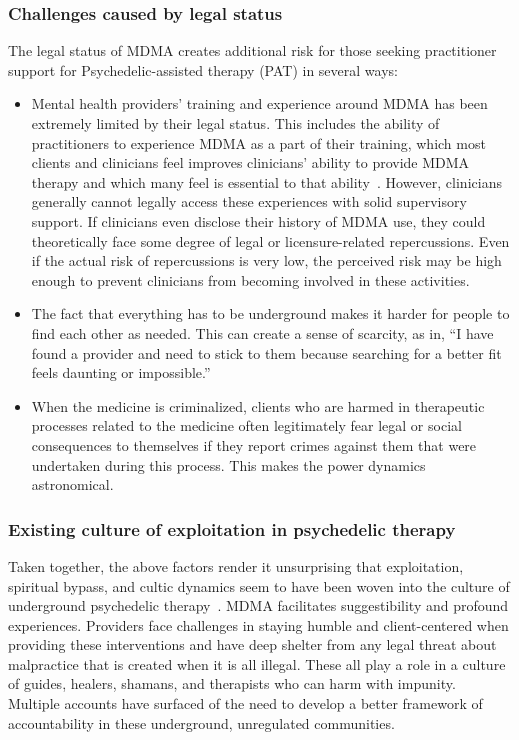 \documentclass[11pt,oneside]{book}
\let\cite\parencite
\begin{document}
\subsubsection*{Challenges caused by legal status}
The legal status of MDMA creates additional risk for those seeking practitioner support for Psychedelic-assisted therapy (PAT) in several ways:
\begin{itemize}
    \item Mental health providers' training and experience around MDMA has been extremely limited by their legal status. This includes the ability of practitioners to experience MDMA as a part of their training, which most clients and clinicians feel improves clinicians' ability to provide MDMA therapy and which many feel is essential to that ability~\cite{liknaitzkyProfessionalExperience}. However, clinicians generally cannot legally access these experiences with solid supervisory support. If clinicians even disclose their history of MDMA use, they could theoretically face some degree of legal or licensure-related repercussions. Even if the actual risk of repercussions is very low, the perceived risk may be high enough to prevent clinicians from becoming involved in these activities.
    \item The fact that everything has to be underground makes it harder for people to find each other as needed.  This can create a sense of scarcity, as in, \enquote{I have found a provider and need to stick to them because searching for a better fit feels daunting or impossible.}
    \item When the medicine is criminalized, clients who are harmed in therapeutic processes related to the medicine often legitimately fear legal or social consequences to themselves if they report crimes against them that were undertaken during this process. This makes the power dynamics astronomical.
\end{itemize}

\subsubsection*{Existing culture of exploitation in psychedelic therapy}
Taken together, the above factors render it unsurprising that exploitation, spiritual bypass, and cultic dynamics seem to have been woven into the culture of underground psychedelic therapy~\cite{abuseLetter,brown2020ethical}. MDMA facilitates suggestibility and profound experiences. Providers face challenges in staying humble and client-centered when providing these interventions and have deep shelter from any legal threat about malpractice that is created when it is all illegal. These all play a role in a culture of guides, healers, shamans, and therapists who can harm with impunity. Multiple accounts have surfaced of the need to develop a better framework of accountability in these underground, unregulated communities.
\end{document}
